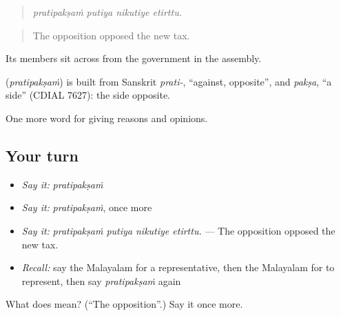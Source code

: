 \begin{quote}
\emph{pratipakṣaṁ putiya nikutiye etirttu.}
\end{quote}

\begin{quote}
The opposition opposed the new tax.
\end{quote}

Its members sit across from the government in the assembly.

\begin{cousinweb}
\textbf{} (\emph{pratipakṣaṁ}) is built from Sanskrit \emph{prati-}, \textquotedblleft{}against, opposite\textquotedblright{}, and \emph{pakṣa}, \textquotedblleft{}a side\textquotedblright{} (CDIAL 7627): the side opposite.
\end{cousinweb}

\begin{grammarlens}[title={What you've built}]
One more word for giving reasons and opinions.
\end{grammarlens}

\subsection*{Your turn}
\begin{itemize}
\raggedright
  \item \emph{Say it:} \emph{pratipakṣaṁ}
  \item \emph{Say it:} \emph{pratipakṣaṁ}, once more
  \item \emph{Say it:} \emph{pratipakṣaṁ putiya nikutiye etirttu.} — The opposition opposed the new tax.
  \item \emph{Recall:} say the Malayalam for a representative, then the Malayalam for to represent, then say \emph{pratipakṣaṁ} again
\end{itemize}

\begin{tcolorbox}[breakable,colback=teal!4,colframe=teal!35!black,title={Before you move on}]
What does  mean? (\textquotedblleft{}The opposition\textquotedblright{}.) Say it once more.
\end{tcolorbox}
